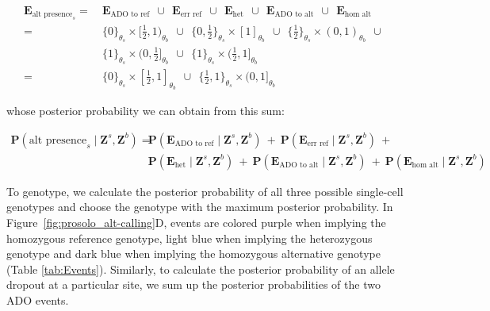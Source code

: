 \documentclass[12pt,inline]{wlscirep}
\newcommand{\Prob}{{\mathbf{P}}}
\begin{document}
\begin{equation}
 \label{eq:compound-event-alt-presence}
 \begin{split}
  \boldsymbol{E}_{\text{alt presence}_s}
  =~&\boldsymbol{E}_\text{ADO to ref}~~\cup~~
    \boldsymbol{E}_\text{err ref}~~\cup~~
    \boldsymbol{E}_\text{het}~~\cup~~
    \boldsymbol{E}_\text{ADO to alt}~~\cup~~
    \boldsymbol{E}_\text{hom alt} \\
  =~&\{0\}_{\theta_s} \times [\frac{1}{2}, 1)_{\theta_b}~~\cup~~
    \{0, \frac{1}{2}\}_{\theta_s} \times [1]_{\theta_b}~~\cup~~
    \{\frac{1}{2}\}_{\theta_s} \times (0,1)_{\theta_b}~~\cup~~\\
    &\{1\}_{\theta_s} \times (0,\frac{1}{2}]_{\theta_b}~~\cup~~
    \{1\}_{\theta_s} \times (\frac{1}{2},1]_{\theta_b} \\
  =~&\{0\}_{\theta_s} \times [\frac{1}{2},1]_{\theta_b}~~\cup~~
    \{\frac{1}{2},1\}_{\theta_s} \times (0,1]_{\theta_b}
 \end{split}
\end{equation}

whose posterior probability we can obtain from this sum:

\begin{equation}
 \label{eq:alt-posterior-prob}
 \begin{split}
  \Prob(\text{alt presence}_s \mid \boldsymbol{Z}^s,\boldsymbol{Z}^b) =~&
    \Prob(\boldsymbol{E}_{\text{ADO to ref}} \mid \boldsymbol{Z}^s,\boldsymbol{Z}^b)~+~ 
    \Prob(\boldsymbol{E}_{\text{err ref}} \mid \boldsymbol{Z}^s,\boldsymbol{Z}^b)~+ \\
  &\Prob(\boldsymbol{E}_{\text{het}} \mid \boldsymbol{Z}^s,\boldsymbol{Z}^b)~+~
  \Prob(\boldsymbol{E}_{\text{ADO to alt}} \mid \boldsymbol{Z}^s,\boldsymbol{Z}^b)~+~
  \Prob(\boldsymbol{E}_{\text{hom alt}} \mid \boldsymbol{Z}^s,\boldsymbol{Z}^b)
 \end{split}
\end{equation}

To genotype, we calculate the posterior probability of all three possible single-cell genotypes and choose the genotype with the maximum posterior probability. 
In Figure~\ref{fig:prosolo_alt-calling}D, events are colored purple when implying the homozygous reference genotype, light blue when implying the heterozygous genotype and dark blue when implying the homozygous alternative genotype (Table \ref{tab:Events}).
Similarly, to calculate the posterior probability of an allele dropout at a particular site, we sum up the posterior probabilities of the two {\ttfamily ADO} events.
\end{document}
